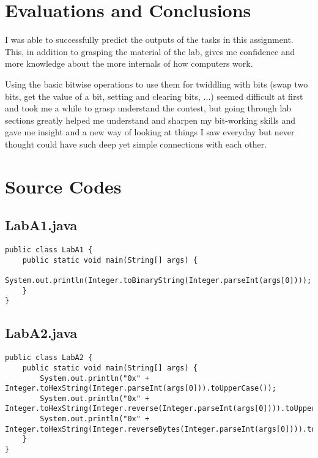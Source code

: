 \documentclass{article}
\begin{document}

\section{Evaluations and Conclusions}
I was able to successfully predict the outputs of the tasks in this assignment. This, in addition to grasping the material of the lab, gives me confidence and more knowledge about the more internals of how computers work. \newline

Using the basic bitwise operations to use them for twiddling with bits (swap two bits, get the value of a bit, setting and clearing bits, ...) seemed difficult at first and took me a while to grasp understand the contest, but going through lab sections greatly helped me understand and sharpen my bit-working skills and gave me insight and a new way of looking at things I saw everyday but never thought could have such deep yet simple connections with each other.



\section{Source Codes}


\subsection{LabA1.java}
\begin{lstlisting}
public class LabA1 {
    public static void main(String[] args) {
        System.out.println(Integer.toBinaryString(Integer.parseInt(args[0])));
    }
}
\end{lstlisting}
\pagebreak

\subsection{LabA2.java}
\begin{lstlisting}
public class LabA2 {
    public static void main(String[] args) {
        System.out.println("0x" + Integer.toHexString(Integer.parseInt(args[0])).toUpperCase());
        System.out.println("0x" + Integer.toHexString(Integer.reverse(Integer.parseInt(args[0]))).toUpperCase());
        System.out.println("0x" + Integer.toHexString(Integer.reverseBytes(Integer.parseInt(args[0]))).toUpperCase());
    }
}
\end{lstlisting}
\end{document}
